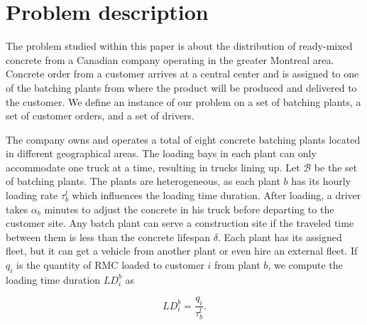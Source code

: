 \documentclass{article}
\begin{document}
{%



\section{Problem description}
\label{desc_form}
The problem studied within this paper is about the distribution of ready-mixed concrete from a Canadian company operating in the greater Montreal area. Concrete order from a customer arrives at a central center and is assigned to one of the batching plants from where the product will be produced and delivered to the customer. We define an instance of our problem on a set of batching plants, a set of customer orders, and a set of drivers.


The company owns and operates a total of eight concrete batching plants located in different geographical areas. The loading bays in each plant can only accommodate one truck at a time, resulting in trucks lining up. Let $\mathcal{B}$ be the set of batching plants. The plants are heterogeneous, as each plant $b$ has its hourly loading rate $\tau^l_b$ which influences the loading time duration. After loading, a driver takes $\alpha_b$ minutes to adjust the concrete in his truck before departing to the customer site. Any batch plant can serve a construction site if the traveled time between them is less than the concrete lifespan $\delta$. Each plant has its assigned fleet, but it can get a vehicle from another plant or even hire an external fleet. If $q_i$ is the quantity of RMC loaded to customer $i$ from plant $b$, we compute the loading time duration $LD^b_i$ as

\begin{equation}
    \label{eq:LD}
    {LD}^b_i = \frac{q_i}{\tau^l_b}.
\end{equation}


}
\end{document}
